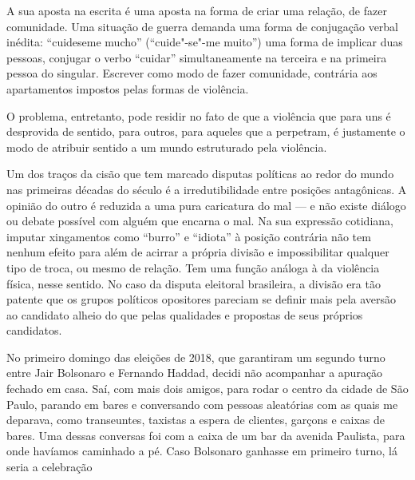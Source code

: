 A sua aposta na escrita é uma aposta na forma de criar uma relação, de
fazer comunidade. Uma situação de guerra demanda uma forma de conjugação verbal inédita:
``cuideseme mucho'' (``cuide"-se"-me muito'') uma forma de implicar duas
pessoas, conjugar o verbo ``cuidar'' simultaneamente na terceira e na
primeira pessoa do singular. Escrever como modo de fazer comunidade,
contrária aos apartamentos impostos pelas formas de violência.

O problema, entretanto, pode residir no fato de que a violência que para
uns é desprovida de sentido, para outros, para aqueles que a perpetram,
é justamente o modo de atribuir sentido a um mundo estruturado pela violência.

\asterisc

Um dos traços da cisão que tem marcado disputas políticas ao redor do
mundo nas primeiras décadas do século  é a irredutibilidade entre
posições antagônicas. A opinião do outro é reduzida a uma pura
caricatura do mal --- e não existe diálogo ou debate possível com alguém que encarna o mal. Na sua
expressão cotidiana, imputar xingamentos como ``burro'' e ``idiota'' à
posição contrária não tem nenhum efeito para além de acirrar a própria
divisão e impossibilitar qualquer tipo de troca, ou mesmo de relação.
Tem uma função análoga à da violência física, nesse sentido. No caso da disputa
eleitoral brasileira, a divisão era tão patente que os grupos políticos
opositores pareciam se definir mais pela aversão ao candidato alheio do
que pelas qualidades e propostas de seus próprios candidatos.

No primeiro domingo das eleições de 2018, que garantiram um segundo
turno entre Jair Bolsonaro e Fernando Haddad, decidi não acompanhar a
apuração fechado em casa. Saí, com mais dois amigos, para rodar o centro
da cidade de São Paulo, parando em bares e conversando com pessoas
aleatórias com as quais me deparava, como transeuntes, taxistas a espera de clientes, garçons e
caixas de bares. Uma dessas conversas foi com a caixa de um bar da
avenida Paulista, para onde havíamos caminhado a pé. Caso Bolsonaro ganhasse em primeiro turno, lá seria a celebração

